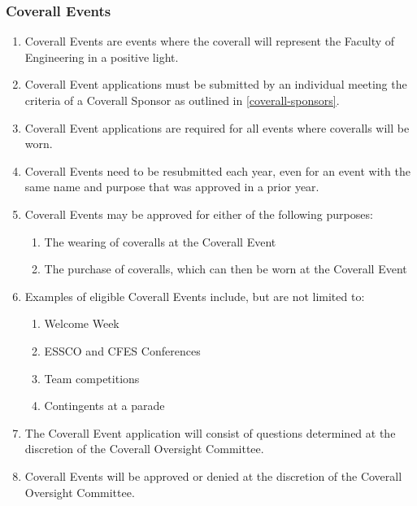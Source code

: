 \subsubsection{Coverall Events}
\label{coverall-events}
\begin{enumerate}
 \item
  Coverall Events are events where the coverall will represent the Faculty of Engineering in a positive light.
 \item
  Coverall Event applications must be submitted by an individual meeting the criteria of a Coverall Sponsor as outlined in \ref{coverall-sponsors}.
 \item
  Coverall Event applications are required for all events where coveralls will be worn.
 \item
  Coverall Events need to be resubmitted each year, even for an event with the same name and purpose that was approved in a prior year.
 \item
  Coverall Events may be approved for either of the following purposes:
  \begin{enumerate}
   \item
    The wearing of coveralls at the Coverall Event
   \item
    The purchase of coveralls, which can then be worn at the Coverall Event
  \end{enumerate}
 \item
  Examples of eligible Coverall Events include, but are not limited to:

  \begin{enumerate}
   \item
    Welcome Week
   \item
    ESSCO and CFES Conferences
   \item
    Team competitions
   \item
    Contingents at a parade
  \end{enumerate}
 \item
  The Coverall Event application will consist of questions determined at the discretion of the Coverall Oversight Committee.
 \item
  Coverall Events will be approved or denied at the discretion of the Coverall Oversight Committee.

\end{enumerate}

